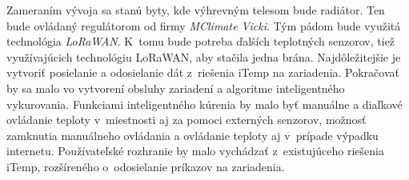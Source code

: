 Zameraním vývoja sa stanú byty, kde výhrevným telesom bude radiátor. 
Ten bude ovládaný regulátorom od firmy \emph{MClimate Vicki}. 
Tým pádom bude využitá technológia \emph{LoRaWAN}. K~tomu bude potreba ďalších teplotných senzorov, tiež využívajúcich technológiu LoRaWAN, aby stačila jedna brána. 
Najdôležitejšie je vytvoriť posielanie a odosielanie dát z~riešenia iTemp na zariadenia. 
Pokračovať by sa malo vo vytvorení obsluhy zariadení a algoritme inteligentného vykurovania.
Funkciami inteligentného kúrenia by malo byť manuálne a diaľkové ovládanie teploty v~miestnosti aj za pomoci externých senzorov, možnosť zamknutia manuálneho ovládania a ovládanie teploty aj v~prípade výpadku internetu.
Používateľské rozhranie by malo vychádzať z~existujúceho riešenia iTemp, rozšíreného o~odosielanie príkazov na zariadenia.